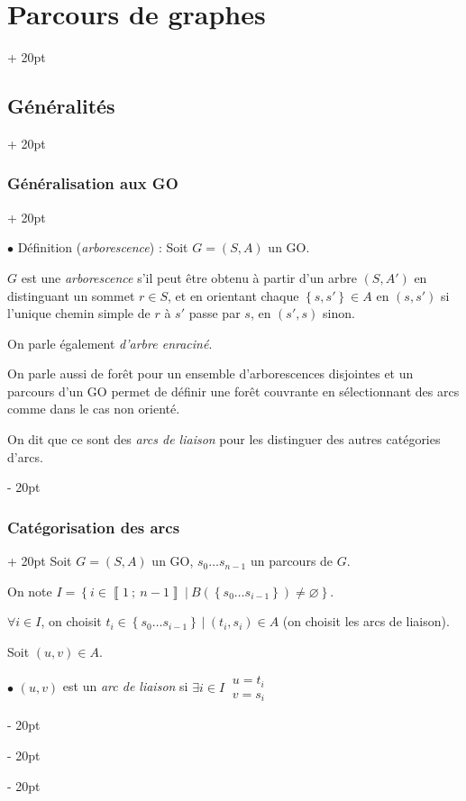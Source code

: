 \documentclass[a4paper, 12pt, twoside]{article}
\newcommand{\nset}[2]{\left\llbracket #1\ ;\ #2 \right\rrbracket}
\newcommand{\set}[1]{\left\{ #1 \right\}}
\newcommand{\ind}[1][20pt]{\advance\leftskip + #1}
\newcommand{\deind}[1][20pt]{\advance\leftskip - #1}
\newenvironment{indt}[2][20pt]{#2 \par \ind[#1]}{\par \deind} %
\begin{document}
\begin{indt}{\section{Parcours de graphes}}
\begin{indt}{\subsection{Généralités}}
\begin{indt}{\subsubsection{Généralisation aux GO}}
                \vspace{12pt}
                
                $\bullet$ Définition (\textit{arborescence}) : Soit $G = (S, A)$ un GO.

                $G$ est une \textit{arborescence} s'il peut être obtenu à partir d'un arbre $(S, A')$ en distinguant un sommet $r \in S$, et en orientant chaque $\set{s, s'} \in A$ en $(s, s')$ si l'unique chemin simple de $r$ à $s'$ passe par $s$, en $(s', s)$ sinon.

                On parle également \textit{d'arbre enraciné}.

                On parle aussi de forêt pour un ensemble d'arborescences disjointes et un parcours d'un GO permet de définir une forêt couvrante en sélectionnant des arcs comme dans le cas non orienté.

                On dit que ce sont des \textit{arcs de liaison} pour les distinguer des autres catégories d'arcs.
            \end{indt}

            \vspace{12pt}
            
            \begin{indt}{\subsubsection{Catégorisation des arcs}}
                Soit $G = (S, A)$ un GO, $s_0 \ldots s_{n - 1}$ un parcours de $G$.

                On note $I = \set{i \in \nset{1}{n - 1}\ |\ B(\set{s_0 \ldots s_{i - 1}}) \neq \varnothing}$.

                $\forall i \in I$, on choisit $t_i \in \set{s_0 \ldots s_{i - 1}}\ |\ (t_i, s_i) \in A$ (on choisit les arcs de liaison).

                Soit $(u, v) \in A$.

                \vspace{6pt}
                
                $\bullet$ $(u, v)$ est un \textit{arc de liaison} si
                $
                    \exists i \in I\
                    \begin{array}{|l}
                        u = t_i
                        \\
                        v = s_i
                    \end{array}
                $


\end{indt}
\end{indt}
\end{indt}
\end{document}
